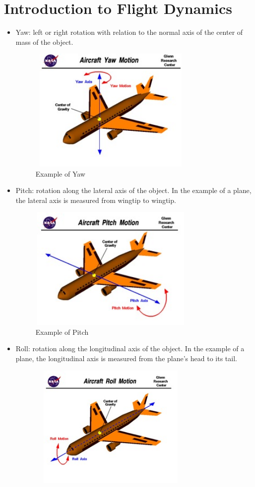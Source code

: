 \documentclass[letterpaper,english, 12pt]{article}
\begin{document}
\section*{Introduction to Flight Dynamics}
\begin{itemize}
		\item Yaw: left or right rotation with relation to the normal axis of the center of mass  of the object. 
		\begin{figure}[t]
			\centering
			\includegraphics[height=6cm, width=80mm]{pics/yaw1.jpg} 
			\caption{Example of Yaw}
		\end{figure}
		\item Pitch: rotation along the lateral axis of the object. In the example of a plane, the lateral axis is measured from wingtip to wingtip. 
		\begin{figure}[t]
			\centering
			\includegraphics[height=6cm, width=80mm]{pics/pitch1.jpg} 
			\caption{Example of Pitch}
		\end{figure}
		\item Roll: rotation along the longitudinal axis of the object. In the example of a plane, the longitudinal axis is measured from the plane's head to its tail. 
		\begin{figure}[t]
			\centering
			\includegraphics[height=6cm, width=80mm]{pics/roll1.jpg} 

\end{figure}
\end{itemize}
\end{document}
